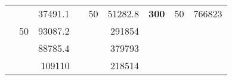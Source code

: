 \begin{table}[H]
\begin{tabular}{|ccrccrccc}
\rowcolor[HTML]{DDFDFF} 
\multicolumn{1}{|c|}{\cellcolor[HTML]{FFFFC7}}                                & \multicolumn{1}{c|}{\cellcolor[HTML]{DDFDFF}}                      & \multicolumn{1}{r|}{\cellcolor[HTML]{DAE8FC}37491.1}   & \multicolumn{1}{c|}{\cellcolor[HTML]{FFFFC7}}                                & \multicolumn{1}{c|}{\multirow{-10}{*}{\cellcolor[HTML]{DDFDFF}50}}  & \multicolumn{1}{r|}{\cellcolor[HTML]{DDFDFF}51282.8}   & \multicolumn{1}{c|}{\multirow{-19}{*}{\cellcolor[HTML]{FFFFC7}\textbf{300}}} & \multicolumn{1}{c|}{\multirow{-10}{*}{\cellcolor[HTML]{DDFDFF}50}} & \multicolumn{1}{r|}{\cellcolor[HTML]{DDFDFF}766823}    \\ \cline{3-3} \cline{5-9} 
\multicolumn{1}{|c|}{\cellcolor[HTML]{FFFFC7}}                                & \multicolumn{1}{c|}{\multirow{-10}{*}{\cellcolor[HTML]{DDFDFF}50}} & \multicolumn{1}{r|}{\cellcolor[HTML]{DDFDFF}93087.2}   & \multicolumn{1}{c|}{\cellcolor[HTML]{FFFFC7}}                                & \multicolumn{1}{c|}{\cellcolor[HTML]{DAE8FC}}                       & \multicolumn{1}{r|}{\cellcolor[HTML]{DAE8FC}291854}    &                                                                              &                                                                    &                                                        \\ \cline{2-3} \cline{6-6}
\multicolumn{1}{|c|}{\cellcolor[HTML]{FFFFC7}}                                & \multicolumn{1}{c|}{\cellcolor[HTML]{DAE8FC}}                      & \multicolumn{1}{r|}{\cellcolor[HTML]{DAE8FC}88785.4}   & \multicolumn{1}{c|}{\cellcolor[HTML]{FFFFC7}}                                & \multicolumn{1}{c|}{\cellcolor[HTML]{DAE8FC}}                       & \multicolumn{1}{r|}{\cellcolor[HTML]{DDFDFF}379793}    &                                                                              &                                                                    &                                                        \\ \cline{3-3} \cline{6-6}
\multicolumn{1}{|c|}{\cellcolor[HTML]{FFFFC7}}                                & \multicolumn{1}{c|}{\cellcolor[HTML]{DAE8FC}}                      & \multicolumn{1}{r|}{\cellcolor[HTML]{DDFDFF}109110}    & \multicolumn{1}{c|}{\cellcolor[HTML]{FFFFC7}}                                & \multicolumn{1}{c|}{\cellcolor[HTML]{DAE8FC}}                       & \multicolumn{1}{r|}{\cellcolor[HTML]{DAE8FC}218514}    &                                                                              &                                                                    &                                                        \\ \cline{3-3} \cline{6-6}

\end{tabular}
\end{table}
